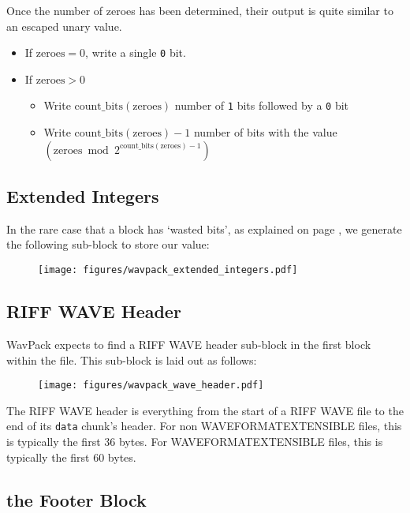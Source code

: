 Once the number of zeroes has been determined, their output is
quite similar to an escaped unary value.
\begin{itemize}
\item If $\text{zeroes} = 0$, write a single \texttt{0} bit.
\item If $\text{zeroes} > 0$
\begin{itemize}
\item Write $\text{count\_bits}(\text{zeroes})$ number of \texttt{1} bits
followed by a \texttt{0} bit
\item Write $\text{count\_bits}(\text{zeroes}) - 1$ number of bits
with the value $(\text{zeroes} \bmod{2 ^ {\text{count\_bits}(\text{zeroes}) - 1}})$
\end{itemize}
\end{itemize}

\subsection{Extended Integers}

In the rare case that a block has `wasted bits',
as explained on page \pageref{wavpack_encode_extended_integers},
we generate the following sub-block to store our
 value:
\begin{figure}[h]
\texttt{[image: figures/wavpack\_extended\_integers.pdf]}
\end{figure}

\clearpage

\subsection{RIFF WAVE Header}

WavPack expects to find a RIFF WAVE header sub-block in the
first block within the file.
This sub-block is laid out as follows:

\begin{figure}[h]
\texttt{[image: figures/wavpack\_wave\_header.pdf]}
\end{figure}

The RIFF WAVE header is everything from the start of a RIFF WAVE file
to the end of its \texttt{data} chunk's header.
For non WAVEFORMATEXTENSIBLE files, this is typically the first 36 bytes.
For WAVEFORMATEXTENSIBLE files, this is typically the first 60 bytes.

\subsection{the Footer Block}

